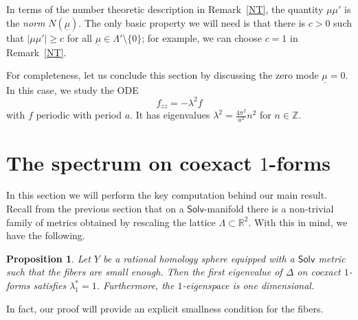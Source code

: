 \documentclass[11pt]{article}
\newtheorem{prop}[theo]{Proposition}
\theoremstyle{definition}
\numberwithin{equation}{section}
\numberwithin{figure}{section}
\numberwithin{table}{section}
\newcommand{\Solv}{\mathsf{Solv}}
\begin{document}
In terms of the number theoretic description in Remark~\ref{NT}, the quantity $\mu\mu'$ is the \emph{norm} $N(\underline{\mu})$. The only basic property we will need is that there is $c>0$ such that $|\mu\mu'|\geq c$ for all $\underline{\mu}\in \Lambda'\setminus \{0\}$; for example, we can choose $c=1$ in Remark~\ref{NT}.


For completeness, let us conclude this section by discussing the zero mode $\underline{\mu}=0$. In this case, we study the ODE
\[
f_{zz}=-\lambda^2 f
\]
with $f$ periodic with period $a$. It has eigenvalues $\lambda^2=\frac{4\pi^2}{a^2} n^2$ for $n\in\mathbb{Z}$.



\section{The spectrum on coexact \texorpdfstring{$1$}{1}-forms}\label{spectralbound}
In this section we will perform the key computation behind our main result. Recall from the previous section that on a $\Solv$-manifold there is a non-trivial family of metrics obtained by rescaling the lattice $\Lambda\subset \mathbb{R}^2$. With this in mind, we have the following.

\begin{prop}\label{maineigen}
Let $Y$ be a rational homology sphere equipped with a $\Solv$ metric such that the fibers are small enough. Then the first eigenvalue of $\Delta$ on coexact $1$-forms satisfies $\lambda_1^*=1$. Furthermore, the $1$-eigenspace is one dimensional.
\end{prop}

In fact, our proof will provide an explicit smallness condition for the fibers.
\end{document}
